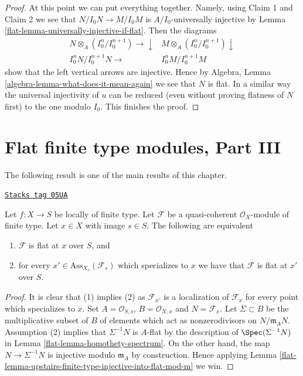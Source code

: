 \begin{proof}
\medskip\noindent
At this point we can put everything together. Namely, using
Claim 1 and Claim 2 we see that $N/I_0 N \to M/I_0M$ is
$A/I_0$-universally injective by
Lemma \ref{flat-lemma-universally-injective-if-flat}.
Then the diagrams
$$
\begin{array}{cc}N \otimes_A (I_0^n/I_0^{n + 1}) \longrightarrow\downarrow & M \otimes_A (I_0^n/I_0^{n + 1}) \downarrow \\ I_0^n N /I_0^{n + 1} N \longrightarrow & I_0^n M /I_0^{n + 1} M\end{array}
$$
show that the left vertical arrows are injective. Hence by
Algebra, Lemma \ref{algebra-lemma-what-does-it-mean-again}
we see that $N$ is flat. In a similar way the
universal injectivity of $u$ can be reduced (even without
proving flatness of $N$ first) to the one modulo $I_0$. This finishes
the proof.
\end{proof}

\section{Flat finite type modules, Part III}
\label{flat-section-finite-type-flat-III}
The following result is one of the main results of this chapter.

\begin{theorem}
\label{flat-theorem-check-flatness-at-associated-points}
\href{https://stacks.math.columbia.edu/tag/05UA}{\texttt{Stacks tag 05UA}}

Let $f : X \to S$ be locally of finite type.
Let $\mathcal{F}$ be a quasi-coherent $\mathcal{O}_X$-module of finite type.
Let $x \in X$ with image $s \in S$.
The following are equivalent
\begin{enumerate}
\item $\mathcal{F}$ is flat at $x$ over $S$, and
\item for every $x' \in \text{Ass}_{X_s}(\mathcal{F}_s)$ which
specializes to $x$ we have that $\mathcal{F}$ is flat at $x'$ over $S$.
\end{enumerate}
\end{theorem}

\begin{proof}

It is clear that (1) implies (2) as $\mathcal{F}_{x'}$ is a localization
of $\mathcal{F}_x$ for every point which specializes to $x$.
Set $A = \mathcal{O}_{S, s}$, $B = \mathcal{O}_{X, x}$ and
$N = \mathcal{F}_x$. Let $\Sigma \subset B$ be the multiplicative
subset of $B$ of elements which act as nonzerodivisors on $N/\mathfrak m_AN$.
Assumption (2) implies that $\Sigma^{-1}N$ is $A$-flat by the description
of $\Spec(\Sigma^{-1}N)$ in
Lemma \ref{flat-lemma-homothety-spectrum}.
On the other hand, the map $N \to \Sigma^{-1}N$ is injective modulo
$\mathfrak m_A$ by construction. Hence applying
Lemma \ref{flat-lemma-upstairs-finite-type-injective-into-flat-mod-m}
we win.
\end{proof}

